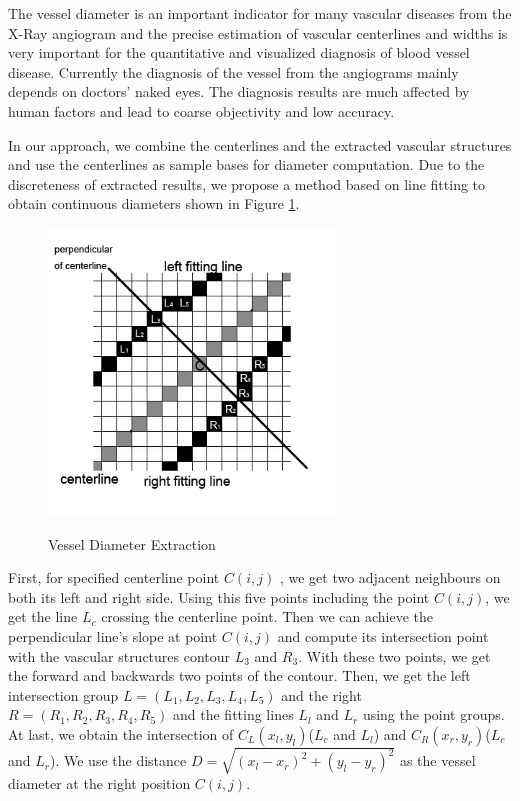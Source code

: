 The vessel diameter is an important indicator for many vascular diseases
from the X-Ray angiogram and the precise estimation of vascular centerlines
and widths is very important for the quantitative and visualized diagnosis
of blood vessel disease. Currently the diagnosis of the vessel from the
angiograms mainly depends on doctors' naked eyes. The diagnosis results are
much affected by human factors and lead to coarse objectivity and low
accuracy.

In our approach, we combine the centerlines and the extracted vascular
structures and use the centerlines as sample bases for diameter computation.
Due to the discreteness of extracted results,  we propose a method based on
line fitting to obtain continuous diameters shown in Figure
\ref{fig:line_fitting}.

\begin{figure}
  \centering
  \includegraphics[width=3.0in]{line_fitting.png}\\
  \caption{Vessel Diameter Extraction}\label{fig:line_fitting}
\end{figure}

First, for specified centerline point $C(i,j)$ , we get two adjacent
neighbours on both its left and right side. Using this five points including
the point $C(i,j)$, we get the line $L_{c}$ crossing the centerline point.
Then we can achieve the perpendicular line's slope at point $C(i,j)$ and
compute its intersection point with the vascular structures contour $L_{3}$
and $R_{3}$. With these two points, we get the forward and backwards two
points of the contour. Then, we get the left intersection group $L=(L_{1},
L_{2}, L_{3}, L_{4}, L_{5})$ and the right $R=(R_{1}, R_{2}, R_{3}, R_{4},
R_{5})$ and the fitting lines $L_{l}$ and $L_{r}$ using the point groups. At
last, we obtain the intersection of $C_{L}(x_{l}, y_{l})$($L_{c}$ and
$L_{l}$) and $C_{R}(x_{r}, y_{r})$($L_{c}$ and $L_{r}$). We use the distance
$D=\sqrt{(x_{l}-x_{r})^2 + (y_{l}-y_{r})^2}$ as the vessel diameter at the
right position $C(i,j)$.

